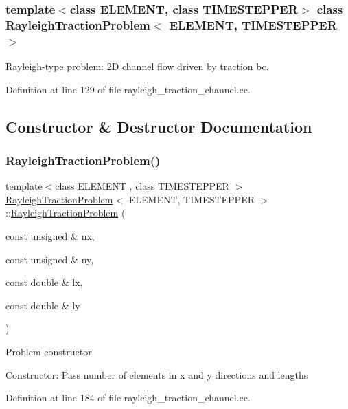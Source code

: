 \subsubsection*{template$<$class E\+L\+E\+M\+E\+NT, class T\+I\+M\+E\+S\+T\+E\+P\+P\+ER$>$\newline
class Rayleigh\+Traction\+Problem$<$ E\+L\+E\+M\+E\+N\+T, T\+I\+M\+E\+S\+T\+E\+P\+P\+E\+R $>$}

Rayleigh-\/type problem\+: 2D channel flow driven by traction bc. 

Definition at line 129 of file rayleigh\+\_\+traction\+\_\+channel.\+cc.



\subsection{Constructor \& Destructor Documentation}
\mbox{\label{classRayleighTractionProblem_a6be21517d8294957f768184a2d51844a}} 
\subsubsection{\texorpdfstring{Rayleigh\+Traction\+Problem()}{RayleighTractionProblem()}}
{\footnotesize\ttfamily template$<$class E\+L\+E\+M\+E\+NT , class T\+I\+M\+E\+S\+T\+E\+P\+P\+ER $>$ \\
\hyperlink{classRayleighTractionProblem}{Rayleigh\+Traction\+Problem}$<$ E\+L\+E\+M\+E\+NT, T\+I\+M\+E\+S\+T\+E\+P\+P\+ER $>$\+::\hyperlink{classRayleighTractionProblem}{Rayleigh\+Traction\+Problem} (\begin{DoxyParamCaption}\item[{const unsigned \&}]{nx,  }\item[{const unsigned \&}]{ny,  }\item[{const double \&}]{lx,  }\item[{const double \&}]{ly }\end{DoxyParamCaption})}



Problem constructor. 

Constructor\+: Pass number of elements in x and y directions and lengths 

Definition at line 184 of file rayleigh\+\_\+traction\+\_\+channel.\+cc.



